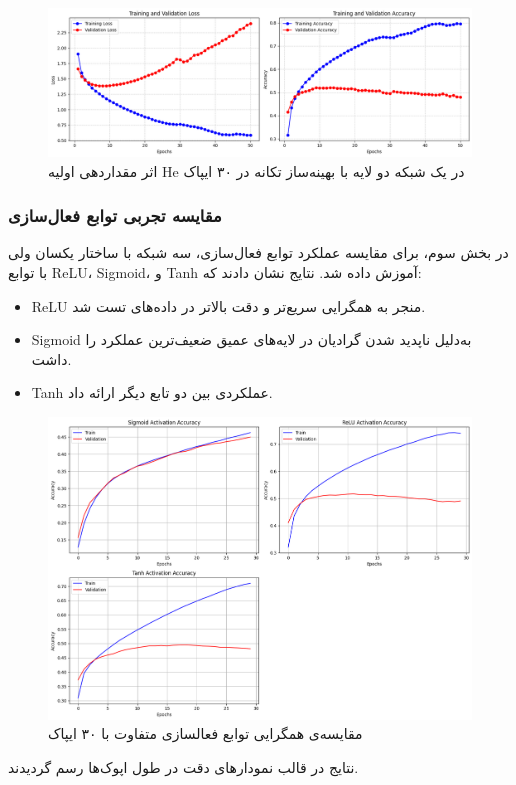 	\begin{figure}[h]
		\centering
		\includegraphics[width=0.7\linewidth]{images/task4-4}
		\caption{اثر مقداردهی اولیه He در یک شبکه دو لایه با بهینه‌ساز تکانه در ۳۰ ایپاک}
		\label{fig:task4-4}
	\end{figure}
	
	
	\subsubsection{مقایسه تجربی توابع فعال‌سازی}
	
	در بخش سوم، برای مقایسه عملکرد توابع فعال‌سازی، سه شبکه با ساختار یکسان ولی با توابع ReLU، Sigmoid، و Tanh آموزش داده شد. نتایج نشان دادند که:
	
	\begin{itemize}
		\item ReLU منجر به همگرایی سریع‌تر و دقت بالاتر در داده‌های تست شد.
		\item Sigmoid به‌دلیل ناپدید شدن گرادیان در لایه‌های عمیق ضعیف‌ترین عملکرد را داشت.
		\item Tanh عملکردی بین دو تابع دیگر ارائه داد.
	\end{itemize}
		\begin{figure}[h]
		\centering
		\includegraphics[width=0.7\linewidth]{images/task4-2}
		\caption{مقایسه‌ی همگرایی توابع فعالسازی متفاوت با ۳۰ ایپاک}
		\label{fig:task4-2}
	\end{figure}
	
	نتایج در قالب نمودارهای دقت در طول اپوک‌ها رسم گردیدند.
	
